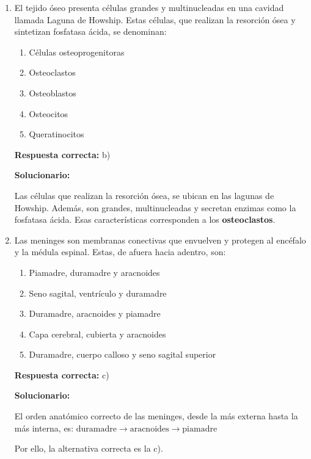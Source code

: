 \begin{enumerate}[resume]
	
	\item El tejido óseo presenta células grandes y multinucleadas en una cavidad llamada Laguna de Howship. Estas células, que realizan la resorción ósea y sintetizan fosfatasa ácida, se denominan:
	\begin{enumerate}[label=\alph*)]
		\item Células osteoprogenitoras
		\item Osteoclastos
		\item Osteoblastos
		\item Osteocitos
		\item Queratinocitos
	\end{enumerate}
	\textbf{Respuesta correcta:} b)
	
	\vspace{2mm}
	\textbf{Solucionario:}
	
	Las células que realizan la resorción ósea, se ubican en las lagunas de Howship. Además, son grandes, multinucleadas y secretan enzimas como la fosfatasa ácida. Esas características corresponden a los \textbf{osteoclastos}.
	
	\vspace{6mm}
	
	\item Las meninges son membranas conectivas que envuelven y protegen al encéfalo y la médula espinal. Estas, de afuera hacia adentro, son:
	\begin{enumerate}[label=\alph*)]
		\item Piamadre, duramadre y aracnoides
		\item Seno sagital, ventrículo y duramadre
		\item Duramadre, aracnoides y piamadre
		\item Capa cerebral, cubierta y aracnoides
		\item Duramadre, cuerpo calloso y seno sagital superior
	\end{enumerate}
	\textbf{Respuesta correcta:} c)
	
	\vspace{2mm}
	\textbf{Solucionario:}
	
	El orden anatómico correcto de las meninges, desde la más externa hasta la más interna, es:
	$ \text{duramadre} \rightarrow \text{aracnoides} \rightarrow \text{piamadre} $
	
	Por ello, la alternativa correcta es la c).
	
	\vspace{6mm}
	

\end{enumerate}
